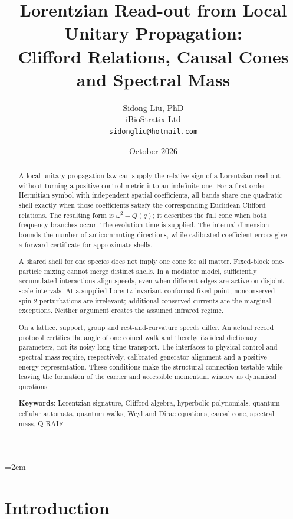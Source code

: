 \documentclass[12pt]{article}
\title{Lorentzian Read-out from Local Unitary Propagation:\\
Clifford Relations, Causal Cones and Spectral Mass}
\author{Sidong Liu, PhD \\
\small iBioStratix Ltd \\
\small \texttt{sidongliu@hotmail.com}}
\date{October 2026}
\theoremstyle{definition}
\theoremstyle{remark}
\begin{document}
\emergencystretch=2em
\raggedbottom
\maketitle

\begin{abstract}
A local unitary propagation law can supply the relative sign of a Lorentzian read-out without turning a positive control metric into an indefinite one. For a first-order Hermitian symbol with independent spatial coefficients, all bands share one quadratic shell exactly when those coefficients satisfy the corresponding Euclidean Clifford relations. The resulting form is $\omega^2-Q(q)$; it describes the full cone when both frequency branches occur. The evolution time is supplied. The internal dimension bounds the number of anticommuting directions, while calibrated coefficient errors give a forward certificate for approximate shells.

A shared shell for one species does not imply one cone for all matter. Fixed-block one-particle mixing cannot merge distinct shells. In a mediator model, sufficiently accumulated interactions align speeds, even when different edges are active on disjoint scale intervals. At a supplied Lorentz-invariant conformal fixed point, nonconserved spin-2 perturbations are irrelevant; additional conserved currents are the marginal exceptions. Neither argument creates the assumed infrared regime.

On a lattice, support, group and rest-and-curvature speeds differ. An actual record protocol certifies the angle of one coined walk and thereby its ideal dictionary parameters, not its noisy long-time transport. The interfaces to physical control and spectral mass require, respectively, calibrated generator alignment and a positive-energy representation. These conditions make the structural connection testable while leaving the formation of the carrier and accessible momentum window as dynamical questions.

\medskip
\noindent\textbf{Keywords}: Lorentzian signature, Clifford algebra, hyperbolic polynomials, quantum cellular automata, quantum walks, Weyl and Dirac equations, causal cone, spectral mass, Q-RAIF
\end{abstract}

\section{Introduction}
\label{sec:intro}
\end{document}
